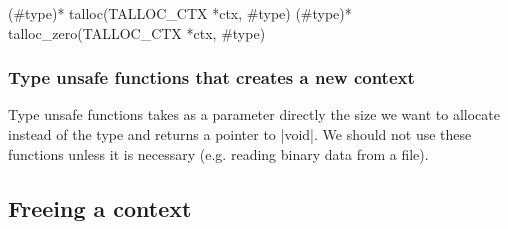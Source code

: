 

\begin{funcproto}
(#type)* talloc(TALLOC_CTX *ctx, #type)
(#type)* talloc_zero(TALLOC_CTX *ctx, #type)
\end{funcproto}
\begin{funcdesc}

\end{funcdesc}


\subsubsection{Type unsafe functions that creates a new context}

Type unsafe functions takes as a parameter directly the size we want to
allocate instead of the type and returns a pointer to |void|. We should not use
these functions unless it is necessary (e.g. reading binary data from a file).



\subsection{Freeing a context}
\label{talloc:subsec:free-context}

